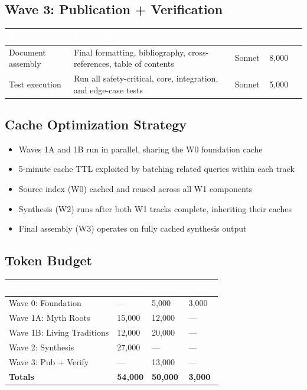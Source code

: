 \documentclass[11pt,letterpaper]{article}
\newcommand{\tableheader}[1]{\textbf{\sffamily\textcolor{white}{#1}}}
\begin{document}
\subsection{Wave 3: Publication + Verification}

\begin{center}
\begin{tabularx}{\textwidth}{L{3cm}XC{1.5cm}C{1.5cm}}
\toprule
{}
\tableheader{Task} & \tableheader{Description} & \tableheader{Model} & \tableheader{Tokens} \\
\midrule
Document assembly & Final formatting, bibliography, cross-references, table of contents & Sonnet & 8,000 \\
Test execution & Run all safety-critical, core, integration, and edge-case tests & Sonnet & 5,000 \\
\bottomrule
\end{tabularx}
\end{center}

\subsection{Cache Optimization Strategy}

\begin{itemize}[leftmargin=2em]
  \item Waves 1A and 1B run in parallel, sharing the W0 foundation cache
  \item 5-minute cache TTL exploited by batching related queries within each track
  \item Source index (W0) cached and reused across all W1 components
  \item Synthesis (W2) runs after both W1 tracks complete, inheriting their caches
  \item Final assembly (W3) operates on fully cached synthesis output
\end{itemize}

\subsection{Token Budget}

\begin{center}
\begin{tabularx}{\textwidth}{L{4cm}C{2cm}C{2cm}C{2cm}}
\toprule
{}
\tableheader{Phase} & \tableheader{Opus} & \tableheader{Sonnet} & \tableheader{Haiku} \\
\midrule
Wave 0: Foundation & --- & 5,000 & 3,000 \\
Wave 1A: Myth Roots & 15,000 & 12,000 & --- \\
Wave 1B: Living Traditions & 12,000 & 20,000 & --- \\
Wave 2: Synthesis & 27,000 & --- & --- \\
Wave 3: Pub + Verify & --- & 13,000 & --- \\
\midrule
\textbf{Totals} & \textbf{54,000} & \textbf{50,000} & \textbf{3,000} \\
\bottomrule
\end{tabularx}
\end{center}
\end{document}
